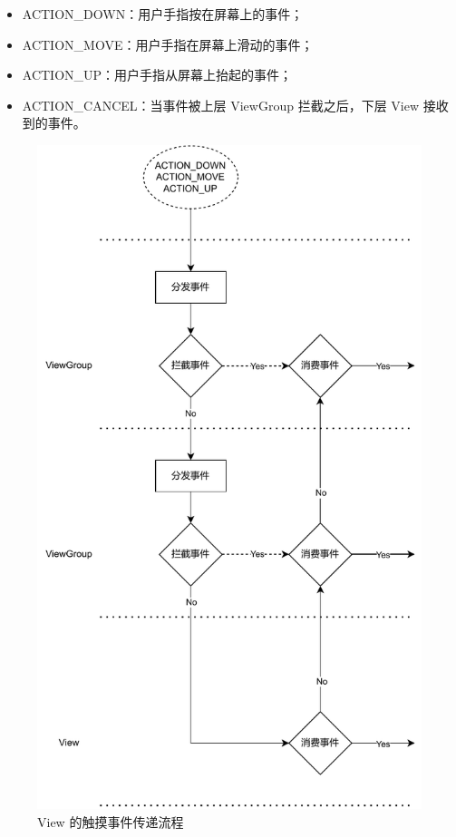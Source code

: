 \begin{itemize}
    \item ACTION\_DOWN：用户手指按在屏幕上的事件；
    \item ACTION\_MOVE：用户手指在屏幕上滑动的事件；
    \item ACTION\_UP：用户手指从屏幕上抬起的事件；
    \item ACTION\_CANCEL：当事件被上层 ViewGroup 拦截之后，下层 View 接收到的事件。
\end{itemize}

\begin{figure}[htbp]
    \centering
    \begin{adjustbox}{max width=\textwidth}
        \includegraphics[scale=0.7]{assets/view-touch-event.pdf}
    \end{adjustbox}
    \caption{View 的触摸事件传递流程}
\end{figure}

